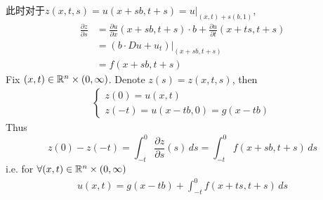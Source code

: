 	\begin{solution}
		此时对于$z(x , t , s) = u(x + sb , t + s) = u \Big|_{(x , t) + s(b , 1)}$, 
		\begin{align}
			\frac{\partial z}{\partial s} 
			&= \frac{\partial u}{\partial x}(x + sb , t + s) \cdot b + \frac{\partial u}{\partial t}(x + ts , t + s) \\
			&= \left( b \cdot Du + u_t \right)\Big|_{(x + sb , t + s)} \\
			&= f(x + sb , t + s)
		\end{align}
		Fix $(x , t) \in \mathbb{R}^n \times (0 , \infty)$. Denote $z(s) = z(x , t , s)$, then
		\begin{align}
			\begin{cases}
				z(0) = u(x , t) \\
				z(-t) = u(x - tb , 0) = g(x - tb)
			\end{cases}
		\end{align}
		Thus
		\[
			z(0) - z(-t) 
			= \int_{-t}^{0} \frac{\partial z}{\partial s}(s) \, ds 
			= \int_{-t}^{0} f(x + sb , t + s) \, ds
		\]
		i.e. for $\forall (x , t) \in \mathbb{R}^n \times (0 , \infty)$
		\begin{align}
			u(x , t) = g(x - tb) + \int_{-t}^{0} f(x + ts , t + s) \, ds 
		\end{align}
	\end{solution}



	\ifx\allfiles\undefined

\fi